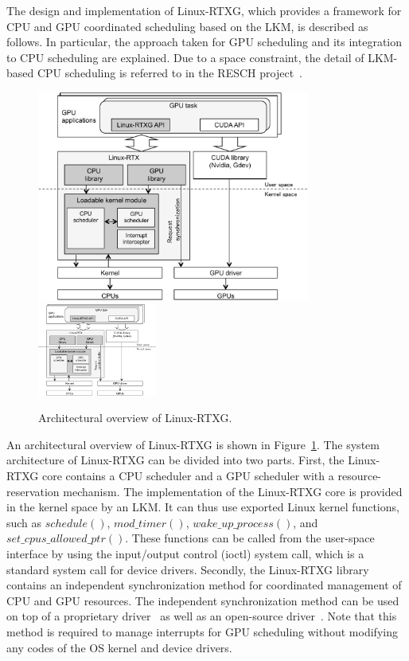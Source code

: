 \label{sec:design_imple}
The design and implementation of Linux-RTXG, which provides a framework for CPU and GPU coordinated scheduling based on the LKM, is described as follows.
In particular, the approach taken for GPU scheduling and its integration to CPU scheduling are explained.
Due to a space constraint, the detail of LKM-based CPU scheduling is referred to in the RESCH project~\cite{kato2009loadable, asberg2012exsched}.


\begin{figure}[t]
\begin{center}
\ifthesis
\includegraphics[width=0.8\textwidth]{img/overview.pdf}
\else
\includegraphics[width=0.35\textwidth]{img/overview.pdf}
\fi
\caption{Architectural overview of Linux-RTXG.}
\label{fig:overview}
\end{center}
\end{figure}

An architectural overview of Linux-RTXG is shown in Figure~\ref{fig:overview}.
The system architecture of Linux-RTXG can be divided into two parts.
First, the Linux-RTXG core contains a CPU scheduler and a GPU scheduler with a resource-reservation mechanism.
The implementation of the Linux-RTXG core is provided in the kernel space by an LKM.
It can thus use exported Linux kernel functions, such as $schedule()$, $mod\_timer()$, $wake\_up\_process()$, and $set\_cpus\_allowed\_ptr()$.
These functions can be called from the user-space interface by using the input/output control (ioctl) system call, which is a standard system call for device drivers.
Secondly, the Linux-RTXG library contains an independent synchronization method for coordinated management of CPU and GPU resources.
The independent synchronization method can be used on top of a proprietary driver~\cite{nvidia:cuda_zone} as well as an open-source driver~\cite{nouveau}.
Note that this method is required to manage interrupts for GPU scheduling without modifying any codes of the OS kernel and device drivers.


